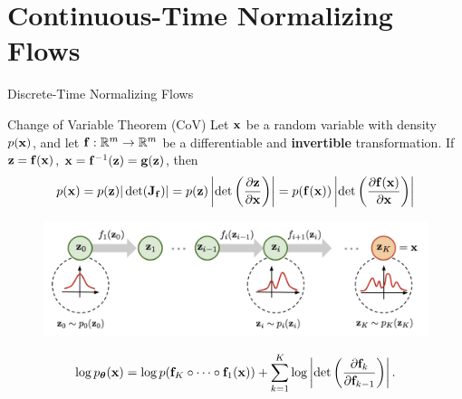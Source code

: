 \documentclass{beamer}
\begin{document}
\section{Continuous-Time Normalizing Flows}
\begin{frame}{Discrete-Time Normalizing Flows}
	\vspace{-0.3cm}
	\begin{block}{Change of Variable Theorem (CoV)}
		Let $\mathbf{x}$ be a random variable with density $p(\mathbf{x})$, and let $\mathbf{f}: \mathbb{R}^m \rightarrow \mathbb{R}^m$ be a differentiable and \textbf{invertible} transformation. If $\mathbf{z} = \mathbf{f}(\mathbf{x})$, $\mathbf{x} = \mathbf{f}^{-1}(\mathbf{z}) = \mathbf{g}(\mathbf{z})$, then
		\vspace{-0.3cm}
		\[
			p(\mathbf{x}) = p(\mathbf{z}) |\det(\mathbf{J}_{\mathbf{f}})| = p(\mathbf{z}) \left|\det \left( \frac{\partial \mathbf{z}}{\partial \mathbf{x}} \right) \right| = p(\mathbf{f}(\mathbf{x})) \left|\det \left(  \frac{\partial \mathbf{f}(\mathbf{x})}{\partial \mathbf{x}} \right) \right|
		\]
		\vspace{-0.5cm}
	\end{block}
	\eqpause

	\vspace{-0.3cm}
	\begin{figure}
		\includegraphics[width=0.95\linewidth]{figs/normalizing-flow}
	\end{figure}
	\vspace{-0.4cm}
	\[
		\log p_{\boldsymbol{\theta}}(\mathbf{x}) = \log p(\mathbf{f}_K \circ \dots \circ \mathbf{f}_1(\mathbf{x})) + \sum_{k=1}^K\log \left|\det \left(\frac{\partial \mathbf{f}_k}{\partial \mathbf{f}_{k-1}}\right)\right|.
	\]
	\vspace{-0.4cm}
\end{frame}
\end{document}
